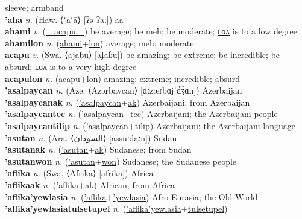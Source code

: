 sleeve; armband \label{ampoltilum} \\
\textbf{'aha} \textit{n.} (Haw. ⟨ʻaʻā⟩ [ʔəˈʔaː])
aa \label{'aha} \\
\textbf{ahami} \textit{v.} (\hyperref[acapu]{~~acapu~~})
be average; be meh; be moderate; \hyperref[ahamilon]{ʟᴏᴧ} is to a low degree \label{ahami} \\
\textbf{ahamilon} \textit{n.} (\hyperref[ahami]{ahami}+\hyperref[lon]{lon})
average; meh; moderate \label{ahamilon} \\
\textbf{acapu} \textit{v.} (Swa. ⟨ajabu⟩ [aʄaɓu])
be amazing; be extreme; be incredible; be absurd; \hyperref[acapulon]{ʟᴏᴧ} is to a very high degree \label{acapu} \\
\textbf{acapulon} \textit{n.} (\hyperref[acapu]{acapu}+\hyperref[lon]{lon})
amazing; extreme; incredible; absurd \label{acapulon} \\
\textbf{'asalpaycan} \textit{n.} (Aze. ⟨Azərbaycan⟩ [ɑːzæɾbɑjˈd͡ʒɑn])
Azerbaijan \label{'asalpaycan} \\
\textbf{'asalpaycanak} \textit{n.} (\hyperref['asalpaycan]{'asalpaycan}+\hyperref[ak]{ak})
Azerbaijani; from Azerbaijan \label{'asalpaycanak} \\
\textbf{'asalpaycantec} \textit{n.} (\hyperref['asalpaycan]{'asalpaycan}+\hyperref[tec]{tec})
Azerbaijani; the Azerbaijani people \label{'asalpaycantec} \\
\textbf{'asalpaycantilip} \textit{n.} (\hyperref['asalpaycan]{'asalpaycan}+\hyperref[tilip]{tilip})
Azerbaijani; the Azerbaijani language \label{'asalpaycantilip} \\
\textbf{'asutan} \textit{n.} (Ara. ⟨السودان‎⟩ [assuːdaːn])
Sudan \label{'asutan} \\
\textbf{'asutanak} \textit{n.} (\hyperref['asutan]{'asutan}+\hyperref[ak]{ak})
Sudanese; from Sudan \label{'asutanak} \\
\textbf{'asutanwon} \textit{n.} (\hyperref['asutan]{'asutan}+\hyperref[won]{won})
Sudanese; the Sudanese people \label{'asutanwon} \\
\textbf{'aflika} \textit{n.} (Swa. ⟨Afrika⟩ [afrika])
Africa \label{'aflika} \\
\textbf{'aflikaak} \textit{n.} (\hyperref['aflika]{'aflika}+\hyperref[ak]{ak})
African; from Africa \label{'aflikaak} \\
\textbf{'aflika'yewlasia} \textit{n.} (\hyperref['aflika]{'aflika}+\hyperref['yewlasia]{'yewlasia})
Afro-Eurasia; the Old World \label{'aflika'yewlasia} \\
\textbf{'aflika'yewlasiatulsetupel} \textit{n.} (\hyperref['aflika'yewlasia]{'aflika'yewlasia}+\hyperref[tulsetupel]{tulsetupel})
